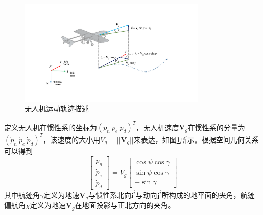 \begin{figure}[htb]   
	\centering
	\includegraphics[width=0.8\textwidth]{figs/chp02/chp02_05_uav_course_frame.pdf}
	\caption{无人机运动轨迹描述}
	\label{fig:chp02_05_uav_course_frame}
\end{figure}

定义无人机在惯性系的坐标为$(p_n\ p_e\ p_d)^T$，无人机速度$\mathbf{V}_g$在惯性系的分量为$(\dot{p}_n\ \dot{p}_e\ \dot{p}_d)^T$，该速度的大小用$V_g = ||\mathbf{V}_g||$来表达，如图\ref{fig:chp02_05_uav_course_frame}所示。根据空间几何关系可以得到
\begin{equation}
\begin{bmatrix} \dot{p}_n \\\dot{p}_e \\ \dot{p}_d \end{bmatrix}  = {V}_g \begin{bmatrix} \cos \psi \cos \gamma \\ \sin \psi \cos \gamma  \\- \sin \gamma \end{bmatrix}
\end{equation}
其中航迹角$\gamma$定义为地速$\mathbf{V}_g$与惯性系北向$\mathbf{i}^i$与动向$\mathbf{j}^i$所构成的地平面的夹角，航迹偏航角$\chi$定义为地速$\mathbf{V}_g$在地面投影与正北方向的夹角。

